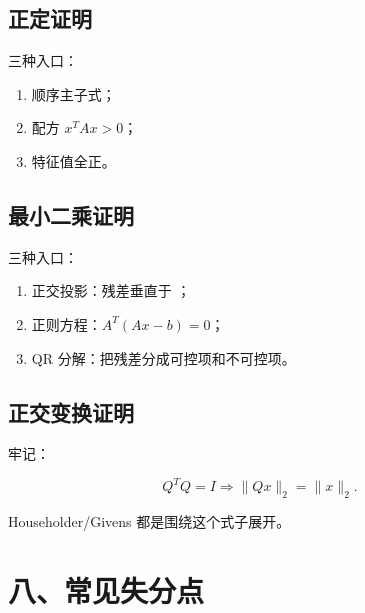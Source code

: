 \documentclass[11pt,a4paper]{ctexart}
\newcommand{\code}[1]{\begingroup\ttfamily\small #1\endgroup}
\begin{document}

\subsection*{正定证明}


三种入口：

\begin{enumerate}

\item 顺序主子式；

\item 配方 $x^TAx>0$；

\item 特征值全正。

\end{enumerate}


\subsection*{最小二乘证明}


三种入口：

\begin{enumerate}

\item 正交投影：残差垂直于 \code{}；

\item 正则方程：$A^T(Ax-b)=0$；

\item QR 分解：把残差分成可控项和不可控项。

\end{enumerate}


\subsection*{正交变换证明}


牢记：

\[
Q^TQ=I \Rightarrow \|Qx\|_2=\|x\|_2.
\]

Householder/Givens 都是围绕这个式子展开。


\section*{八、常见失分点}
\end{document}
